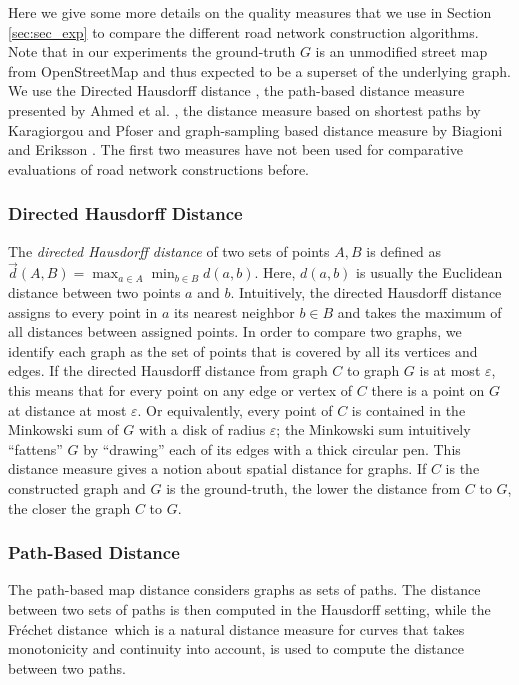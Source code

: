 \documentclass[natbib]{svjour3}                    \smartqed  \usepackage[table]{xcolor}
\newcommand{\Frd}{Fr\'echet distance}
\begin{document}
Here we give some more details on the quality measures that we use in Section \ref{sec:sec_exp} to compare the different road network construction algorithms. Note that in our experiments the ground-truth $G$ is an unmodified street map from OpenStreetMap and thus expected to be a superset of the underlying graph. We use the Directed Hausdorff distance \cite{ag-dgsmi-99}, the path-based distance measure presented by Ahmed et al. \cite{aw-SIGSPATIAL-13}, the distance measure based on shortest paths by Karagiorgou and Pfoser \cite{Karagiorgou:2012:VTD:2424321.2424334} and graph-sampling based distance measure 
by Biagioni and Eriksson \cite{be-irmgp-12}. The first two measures have not been used for comparative evaluations of road network constructions before.

\subsubsection{Directed Hausdorff Distance \protect\cite{ag-dgsmi-99}}
The {\em directed Hausdorff distance}
of two sets of points $A, B$ is defined as $\overrightarrow{d}(A,B) = \max_{a \in A}\min_{b \in B} d(a,b)$. Here,
$d(a,b)$ is usually the Euclidean distance between two points $a$ and $b$. Intuitively, the directed Hausdorff distance assigns to every point in $a$ its nearest neighbor $b\in B$ and takes the maximum of all distances between assigned points.
In order to compare two graphs, we identify each graph as the set of points that is covered by all its vertices and edges. 
If the directed Hausdorff distance from graph $C$ to graph $G$ is at most $\varepsilon$, this means that for every point on any edge or vertex of $C$ there is a point on $G$ at distance at most $\varepsilon$. 
Or equivalently, every point of $C$ is contained in the Minkowski sum of $G$ with a disk of radius $\varepsilon$; the Minkowski sum intuitively ``fattens'' $G$ by ``drawing'' each of its edges with a thick circular pen.  
This distance measure gives a notion about spatial distance for graphs. 
If $C$ is the constructed graph and $G$ is the ground-truth, the lower the distance from $C$ to $G$, the closer the graph $C$ to $G$.





\subsubsection{Path-Based Distance \protect\cite{aw-SIGSPATIAL-13}}
The path-based map distance considers graphs as sets of paths. The distance between two sets of paths is then computed in the Hausdorff setting, while the \Frd\, which is a natural distance measure for curves that takes monotonicity and continuity into account, is used to compute the distance between two paths. 
\end{document}
